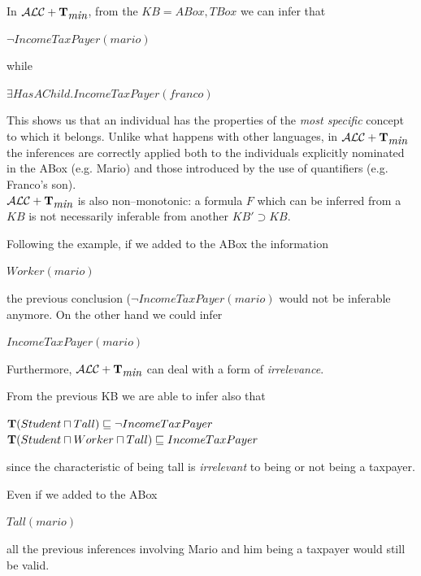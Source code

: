 \documentclass[a4paper, 11pt, oneside]{duthesis}
\newcommand{\tip}{{\bf T}}
\newcommand{\alctmin}{\mathcal{ALC}+\tip_{\mbox{\em min}}}
\begin{document}
In $\alctmin$, from the $KB={ABox, TBox}$ we can infer that
\begin{center}$\neg IncomeTaxPayer(mario)$\end{center}
while
\begin{center}$\exists HasAChild.IncomeTaxPayer(franco)$\end{center}
This shows us that an individual has the properties of the \emph{most specific} concept to which it belongs. Unlike what happens with other languages, in $\alctmin$ the inferences are correctly applied both to the individuals explicitly nominated in the ABox (e.g. Mario) and those introduced by the use of quantifiers (e.g. Franco's son).\\

$\alctmin$ is also non--monotonic: a formula $F$ which can be inferred from a $KB$ is not necessarily inferable from another $KB' \supset KB$.

Following the example, if we added to the ABox the information
\begin{center}$Worker(mario)$\end{center}
the previous conclusion ($\neg IncomeTaxPayer(mario)$ would not be inferable anymore. On the other hand we could infer
\begin{center}$IncomeTaxPayer(mario)$\end{center}

Furthermore, $\alctmin$ can deal with a form of \emph{irrelevance}.

From the previous KB we are able to infer also that
\begin{center}
$\tip(Student \sqcap Tall) \sqsubseteq \neg IncomeTaxPayer$\\
$\tip(Student \sqcap Worker \sqcap Tall) \sqsubseteq IncomeTaxPayer$
\end{center}
since the characteristic of being tall is \emph{irrelevant} to being or not being a taxpayer.

Even if we added to the ABox
\begin{center}
$Tall(mario)$
\end{center}
all the previous inferences involving Mario and him being a taxpayer would still be valid.
\newpage

\end{document}
